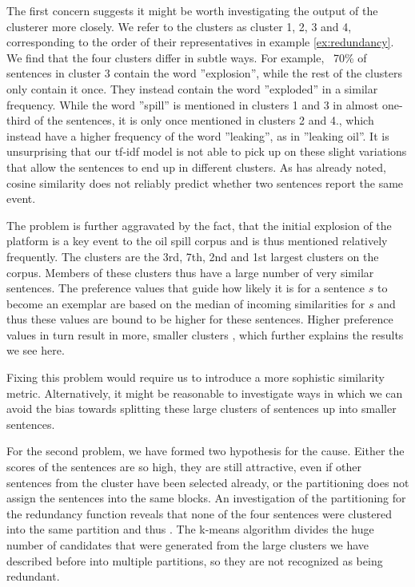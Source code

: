 \documentclass[a4paper,BCOR=10mm]{report}
\numberwithin{lemma}{chapter}
\numberwithin{definition}{chapter}
\begin{document}
The first concern suggests it might be worth investigating the output of the clusterer more closely.
We refer to the clusters as cluster 1, 2, 3 and 4, corresponding to the order of their representatives in example \ref{ex:redundancy}.
We find that the four clusters differ in subtle ways.
For example, ~70\% of sentences in cluster 3 contain the word ''explosion'', while the rest of the clusters only contain it once. They instead contain the word ''exploded'' in a similar frequency.
While the word ''spill'' is mentioned in clusters 1 and 3 in almost one-third of the sentences, it is only once mentioned in clusters 2 and 4., which instead have a higher frequency of the word ''leaking'', as in ''leaking oil''.
It is unsurprising that our tf-idf model is not able to pick up on these slight variations that allow the sentences to end up in different clusters. As \citet{chieu} has already noted, cosine similarity does not reliably predict whether two sentences report the same event.

The problem is further aggravated by the fact, that the initial explosion of the platform is a key event to the oil spill corpus and is thus mentioned relatively frequently. The clusters are the 3rd, 7th, 2nd and 1st largest clusters on the corpus. Members of these clusters thus have a large number of very similar sentences. The preference values that guide how likely it is for a sentence $s$ to become an exemplar are based on the median of incoming similarities for $s$ and thus these values are bound to be higher for these sentences.
Higher preference values in turn result in more, smaller clusters \citep{ap}, which further explains the results we see here.

Fixing this problem would require us to introduce a more sophistic similarity metric. Alternatively, it might be reasonable to investigate ways in which we can avoid the bias towards splitting these large clusters of sentences up into smaller sentences.

For the second problem, we have formed two hypothesis for the cause. Either the scores of the sentences are so high, they are still attractive, even if other sentences from the cluster have been selected already, or the partitioning does not assign the sentences into the same blocks.
An investigation of the partitioning for the redundancy function reveals that none of the four sentences were clustered into the same partition and thus . The k-means algorithm divides the huge number of candidates that were generated from the large clusters we have described before into multiple partitions, so they are not recognized as being redundant.
\end{document}
